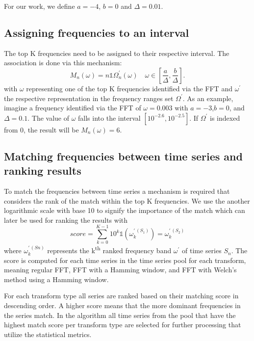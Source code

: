\documentclass[phd,black, hidelinks]{PrincetonThesis}
\begin{document}
For our work, we define \(a=-4\), \(b=0\) and \(\Delta=0.01\).

\subsection{Assigning frequencies to an interval}
\label{sec:orgb0f6e53}
\label{org772d555}
The top K frequencies need to be assigned to their respective interval. The association is done via this mechanism:
\begin{equation}
M_n(\omega)= n \mathds{1} \Omega^{\prime}_n(\omega) \quad \omega \in \left[\frac{a}{\Delta}, \frac{b}{\Delta}  \right].
\end{equation}
with \(\omega\) representing one of the top K frequencies identified via the FFT and \(\omega^{\prime}\) the respective representation in the frequency ranges set \(\Omega^{\prime}\). As an example, imagine a frequency identified via the FFT of \(\omega=0.003\) with \(a=-3\),\(b=0\), and \(\Delta=0.1\). The value of \(\omega\) falls into the interval \([10^{-2.6}, 10^{-2.5}]\). If \(\Omega^{\prime}\) is indexed from 0, the result will be \(M_n(\omega) = 6\).

\subsection{Matching frequencies between time series and ranking results}
\label{sec:org44f48f1}
\label{org93cfc1e}
To match the frequencies between time series a mechanism is required that considers the rank of the match within the top K frequencies. We use the another logarithmic scale with base 10 to signify the importance of the match which can later be used for ranking the results with
\begin{equation}
score = \sum_{k=0}^{K-1} 10^{k}\mathds{1}(\omega_{k}^{\prime \,(S_1)}) = \omega_k^{\prime \, (S_2)}
\end{equation}
where \(\omega_{k}^{\prime \, (Sn)}\) represents the k\textsuperscript{th} ranked frequency band \(\omega^{\prime}\) of time series \(S_n\). The score is computed for each time series in the time series pool for each transform, meaning regular FFT, FFT with a Hamming window, and FFT with Welch's method using a Hamming window.

For each transform type all series are ranked based on their matching score in descending order. A higher score means that the more dominant frequencies in the series match. In the algorithm all time series from the pool that have the highest match score per transform type are selected for further processing that utilize the statistical metrics.
\end{document}
